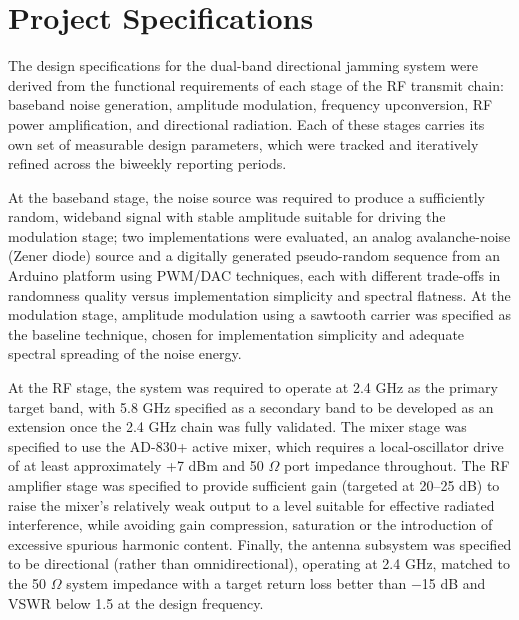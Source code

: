 \documentclass[12pt,a4paper]{report}
\begin{document}
	
	\section{Project Specifications}
	The design specifications for the dual-band directional jamming system were derived from the functional requirements of each stage of the RF transmit chain: baseband noise generation, amplitude modulation, frequency upconversion, RF power amplification, and directional radiation. Each of these stages carries its own set of measurable design parameters, which were tracked and iteratively refined across the biweekly reporting periods.
	
	\vspace{0.5cm}
	
	At the baseband stage, the noise source was required to produce a sufficiently random, wideband signal with stable amplitude suitable for driving the modulation stage; two implementations were evaluated, an analog avalanche-noise (Zener diode) source and a digitally generated pseudo-random sequence from an Arduino platform using PWM/DAC techniques, each with different trade-offs in randomness quality versus implementation simplicity and spectral flatness. At the modulation stage, amplitude modulation using a sawtooth carrier was specified as the baseline technique, chosen for implementation simplicity and adequate spectral spreading of the noise energy.
	
	\vspace{0.5cm}
	
At the RF stage, the system was required to operate at 2.4 GHz as the primary target band, with 5.8 GHz specified as a secondary band to be developed as an extension once the 2.4 GHz chain was fully validated. The mixer stage was specified to use the AD-830+ active mixer, which requires a local-oscillator drive of at least approximately +7 dBm and 50 $\Omega$ port impedance throughout. The RF amplifier stage was specified to provide sufficient gain (targeted at 20--25 dB) to raise the mixer's relatively weak output to a level suitable for effective radiated interference, while avoiding gain compression, saturation or the introduction of excessive spurious harmonic content. Finally, the antenna subsystem was specified to be directional (rather than omnidirectional), operating at 2.4 GHz, matched to the 50 $\Omega$ system impedance with a target return loss better than $-$15 dB and VSWR below 1.5 at the design frequency.
	
\end{document}
